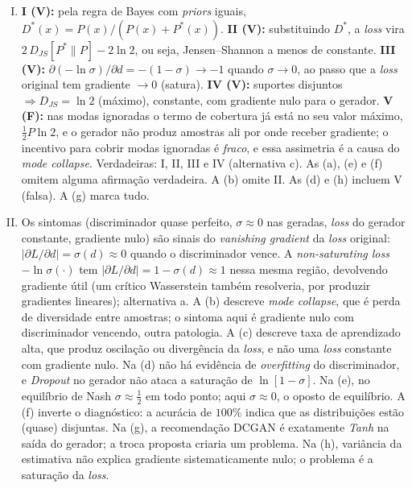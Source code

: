 \documentclass{dlproblemset}
\begin{document}
\begin{enumerate}[I)]
    \item \textbf{I (V):} pela regra de Bayes com \textit{priors} iguais, $D^{*}(x) = P(x)/(P(x)+P^{*}(x))$. \textbf{II (V):} substituindo $D^{*}$, a \emph{loss} vira $2\,D_{JS}[P^{*}\|P] - 2\ln 2$, ou seja, Jensen--Shannon a menos de constante. \textbf{III (V):} $\partial(-\ln\sigma)/\partial d = -(1-\sigma) \to -1$ quando $\sigma\to 0$, ao passo que a \emph{loss} original tem gradiente $\to 0$ (satura). \textbf{IV (V):} suportes disjuntos $\Rightarrow D_{JS} = \ln 2$ (máximo), constante, com gradiente nulo para o gerador. \textbf{V (F):} nas modas ignoradas o termo de cobertura já está no seu valor máximo, $\tfrac{1}{2}P\ln 2$, e o gerador não produz amostras ali por onde receber gradiente; o incentivo para cobrir modas ignoradas é \emph{fraco}, e essa assimetria é a causa do \textit{mode collapse}. Verdadeiras: I, II, III e IV (alternativa c). As (a), (e) e (f) omitem alguma afirmação verdadeira. A (b) omite II. As (d) e (h) incluem V (falsa). A (g) marca tudo.

    \item Os sintomas (discriminador quase perfeito, $\sigma \approx 0$ nas geradas, \emph{loss} do gerador constante, gradiente nulo) são sinais do \textit{vanishing gradient} da \emph{loss} original: $|\partial L/\partial d| = \sigma(d) \approx 0$ quando o discriminador vence. A \textit{non-saturating loss} $-\ln\sigma(\cdot)$ tem $|\partial L/\partial d| = 1 - \sigma(d) \approx 1$ nessa mesma região, devolvendo gradiente útil (um crítico Wasserstein também resolveria, por produzir gradientes lineares); alternativa a. A (b) descreve \textit{mode collapse}, que é perda de diversidade entre amostras; o sintoma aqui é gradiente nulo com discriminador vencendo, outra patologia. A (c) descreve taxa de aprendizado alta, que produz oscilação ou divergência da \emph{loss}, e não uma \emph{loss} constante com gradiente nulo. Na (d) não há evidência de \textit{overfitting} do discriminador, e \textit{Dropout} no gerador não ataca a saturação de $\ln[1-\sigma]$. Na (e), no equilíbrio de Nash $\sigma \approx \tfrac{1}{2}$ em todo ponto; aqui $\sigma \approx 0$, o oposto de equilíbrio. A (f) inverte o diagnóstico: a acurácia de $100\%$ indica que as distribuições estão (quase) disjuntas. Na (g), a recomendação DCGAN é exatamente \emph{Tanh} na saída do gerador; a troca proposta criaria um problema. Na (h), variância da estimativa não explica gradiente sistematicamente nulo; o problema é a saturação da \emph{loss}.


\end{enumerate}
\end{document}

